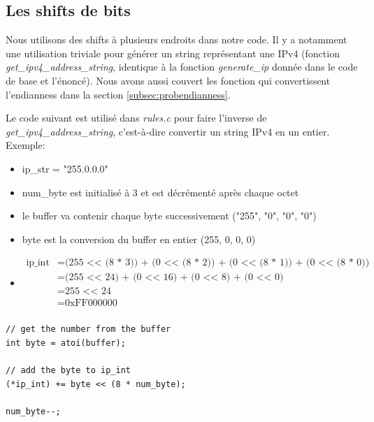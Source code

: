 \documentclass[a4paper]{article}
\begin{document}
\subsection{Les shifts de bits}



Nous utilisons des shifts à plusieurs endroits dans notre code. Il y a notamment une utilisation triviale pour générer un string représentant une IPv4 (fonction \textit{get\_ipv4\_address\_string}, identique à la fonction \textit{generate\_ip} donnée dans le code de base et l'énoncé). Nous avons aussi couvert les fonction qui convertissent l'endianness dans la section \ref{subsec:probendianness}.

Le code suivant est utilisé dans \textit{rules.c} pour faire l'inverse de \textit{get\_ipv4\_address\_string}, c'est-à-dire convertir un string IPv4 en un entier. Exemple:
\begin{itemize}
    \item ip\_str = "255.0.0.0"
    \item num\_byte est initialisé à 3 et est décrémenté après chaque octet
    \item le buffer va contenir chaque byte successivement ("255", "0", "0", "0")
    \item byte est la conversion du buffer en entier (255, 0, 0, 0)
    \item \[\begin{aligned}
        \text{ip\_int}
        &= \text{(255 <{}< (8 * 3)) + (0 <{}< (8 * 2)) + (0 <{}< (8 * 1)) + (0 <{}< (8 * 0))} \\
        &= \text{(255 <{}< 24) + (0 <{}< 16) + (0 <{}< 8) + (0 <{}< 0)} \\
        &= \text{255 <{}< 24} \\
        &= \text{0xFF000000} \\
    \end{aligned}\]
\end{itemize}

\begin{lstlisting}[style=CStyle]
// get the number from the buffer
int byte = atoi(buffer);

// add the byte to ip_int
(*ip_int) += byte << (8 * num_byte);

num_byte--;
\end{lstlisting}
\end{document}
